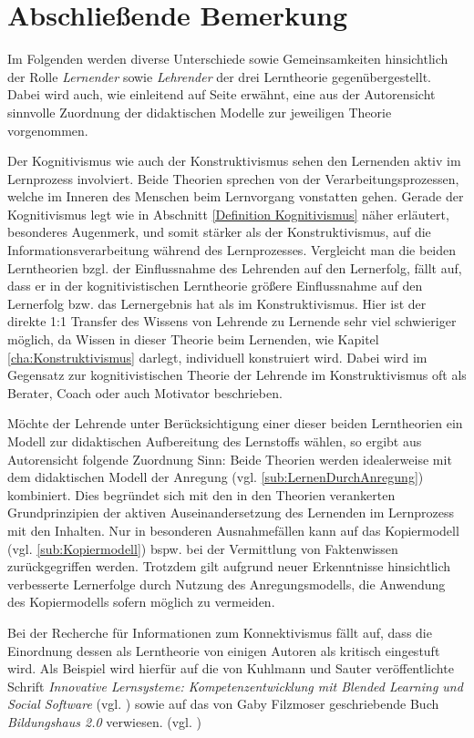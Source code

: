 \chapter{Abschließende Bemerkung}
\label{cha:Schluss}
Im Folgenden werden diverse Unterschiede sowie Gemeinsamkeiten hinsichtlich der Rolle \emph{Lernender} sowie \emph{Lehrender} der drei Lerntheorie gegenübergestellt. Dabei wird auch, wie einleitend auf Seite \pageref{cha:Einleitung} erwähnt, eine aus der Autorensicht sinnvolle Zuordnung der didaktischen Modelle zur jeweiligen Theorie vorgenommen. 

Der Kognitivismus wie auch der Konstruktivismus sehen den Lernenden aktiv im Lernprozess involviert. Beide Theorien sprechen von der Verarbeitungsprozessen, welche im Inneren des Menschen beim Lernvorgang vonstatten gehen. Gerade der Kognitivismus legt wie in Abschnitt \ref{Definition Kognitivismus} näher erläutert, besonderes Augenmerk, und somit stärker als der Konstruktivismus, auf die Informationsverarbeitung während des Lernprozesses. Vergleicht man die beiden Lerntheorien bzgl. der Einflussnahme des Lehrenden auf den Lernerfolg, fällt auf, dass er in der kognitivistischen Lerntheorie größere Einflussnahme auf den Lernerfolg bzw. das Lernergebnis hat als im Konstruktivismus. Hier ist der direkte 1:1 Transfer des Wissens von Lehrende zu Lernende sehr viel schwieriger möglich, da Wissen in dieser Theorie beim Lernenden, wie Kapitel \ref{cha:Konstruktivismus} darlegt, individuell konstruiert wird. Dabei wird im Gegensatz zur kognitivistischen Theorie der Lehrende im Konstruktivismus oft als Berater, Coach oder auch Motivator beschrieben. \cite[S. 30ff.]{Bohm.2006} %

Möchte der Lehrende unter Berücksichtigung einer dieser beiden Lerntheorien ein Modell zur didaktischen Aufbereitung des Lernstoffs wählen, so ergibt aus Autorensicht folgende Zuordnung Sinn: Beide Theorien werden idealerweise mit dem didaktischen Modell der Anregung (vgl. \ref{sub:LernenDurchAnregung}) kombiniert. Dies begründet sich mit den in den Theorien verankerten Grundprinzipien der aktiven Auseinandersetzung des Lernenden im Lernprozess mit den Inhalten. Nur in besonderen Ausnahmefällen kann auf das Kopiermodell (vgl. \ref{sub:Kopiermodell}) bspw. bei der Vermittlung von Faktenwissen zurückgegriffen werden. Trotzdem gilt aufgrund neuer Erkenntnisse hinsichtlich verbesserte Lernerfolge durch Nutzung des Anregungsmodells, die Anwendung des Kopiermodells sofern möglich zu vermeiden.

Bei der Recherche für Informationen zum Konnektivismus fällt auf, dass die Einordnung dessen als Lerntheorie von einigen Autoren als kritisch eingestuft wird. Als Beispiel wird hierfür auf die von Kuhlmann und Sauter veröffentlichte Schrift \emph{Innovative Lernsysteme: Kompetenzentwicklung mit Blended Learning und Social Software} (vgl. \cite{Kuhlmann.2008}) sowie auf das von Gaby Filzmoser geschriebende Buch \emph{Bildungshaus 2.0} verwiesen. (vgl. \cite{Filzmoser.2013})

